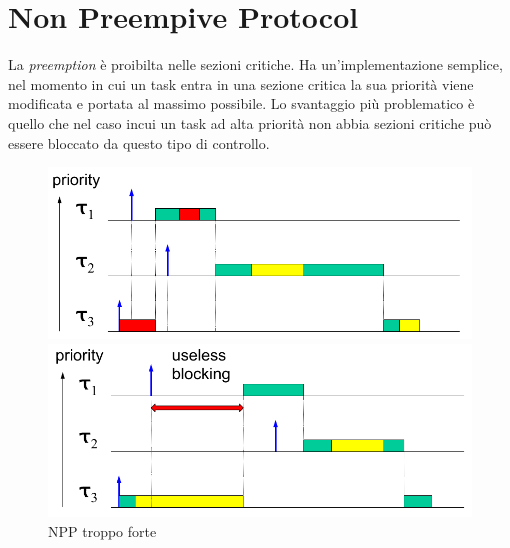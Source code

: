 \section{Non Preempive Protocol}
La \textit{preemption} è proibilta nelle sezioni critiche. Ha un'implementazione semplice, nel momento in cui un task entra in una sezione critica la sua priorità viene modificata e portata al massimo possibile. Lo svantaggio più problematico è quello che nel caso incui un task ad alta priorità non abbia sezioni critiche può essere bloccato da questo tipo di controllo.
\begin{figure}[h]
    \centering
    \begin{minipage}[t]{0.45\textwidth}
        \centering
        \includegraphics[width=\textwidth]{img/npp}
        \caption{$P_{CS} = max\{P_1, ..., P_n\}$}
    \end{minipage}
    \begin{minipage}[t]{0.45\textwidth}
        \centering
        \includegraphics[width=\textwidth]{img/npp_2}
        \caption{NPP troppo forte}
    \end{minipage}
\end{figure}

